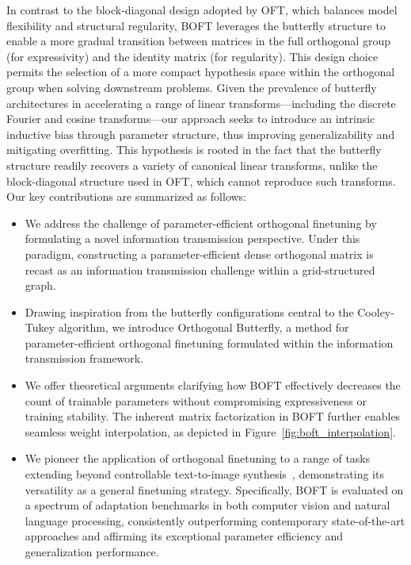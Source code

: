 In contrast to the block-diagonal design adopted by OFT, which balances model flexibility and structural regularity, BOFT leverages the butterfly structure to enable a more gradual transition between matrices in the full orthogonal group (for expressivity) and the identity matrix (for regularity). This design choice permits the selection of a more compact hypothesis space within the orthogonal group when solving downstream problems. Given the prevalence of butterfly architectures in accelerating a range of linear transforms—including the discrete Fourier and cosine transforms—our approach seeks to introduce an intrinsic inductive bias through parameter structure, thus improving generalizability and mitigating overfitting. This hypothesis is rooted in the fact that the butterfly structure readily recovers a variety of canonical linear transforms, unlike the block-diagonal structure used in OFT, which cannot reproduce such transforms. Our key contributions are summarized as follows:

\begin{itemize}[leftmargin=*,nosep]
    \item We address the challenge of parameter-efficient orthogonal finetuning by formulating a novel information transmission perspective. Under this paradigm, constructing a parameter-efficient dense orthogonal matrix is recast as an information transmission challenge within a grid-structured graph.
    \item Drawing inspiration from the butterfly configurations central to the Cooley-Tukey algorithm, we introduce Orthogonal Butterfly, a method for parameter-efficient orthogonal finetuning formulated within the information transmission framework.
    \item We offer theoretical arguments clarifying how BOFT effectively decreases the count of trainable parameters without compromising expressiveness or training stability. The inherent matrix factorization in BOFT further enables seamless weight interpolation, as depicted in Figure~\ref{fig:boft_interpolation}.
    \item We pioneer the application of orthogonal finetuning to a range of tasks extending beyond controllable text-to-image synthesis~\cite{qiu2023controlling}, demonstrating its versatility as a general finetuning strategy. Specifically, BOFT is evaluated on a spectrum of adaptation benchmarks in both computer vision and natural language processing, consistently outperforming contemporary state-of-the-art approaches and affirming its exceptional parameter efficiency and generalization performance.
\end{itemize}

